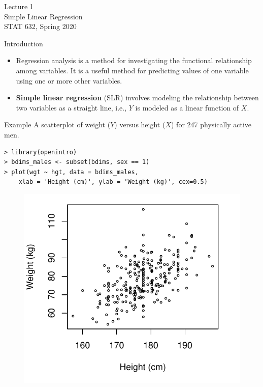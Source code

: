\documentclass[10pt]{beamer}
\begin{document}
\begin{frame}
\large
Lecture 1\\
Simple Linear Regression\\
STAT 632, Spring 2020
\end{frame}

\begin{frame}{Introduction}
\begin{itemize}
\item Regression analysis is a method for investigating the functional relationship among variables.  It is a useful method for predicting values of one variable using one or more other variables. 
\vspace{10pt}
\item \textbf{Simple linear regression} (SLR) involves modeling the relationship between two variables as a straight line, i.e., $Y$ is modeled as a linear function of $X$.
\end{itemize}
\end{frame}

\begin{frame}[fragile]{Example}
A scatterplot of weight ($Y$) versus height ($X$) for 247 physically active men.
\small
\begin{verbatim}
> library(openintro)
> bdims_males <- subset(bdims, sex == 1) 
> plot(wgt ~ hgt, data = bdims_males, 
    xlab = 'Height (cm)', ylab = 'Weight (kg)', cex=0.5)
\end{verbatim}
\begin{figure}[htbp]
\centering
\includegraphics[scale=0.5]{figure/wgt_hgt_plot.pdf}
\end{figure}
\end{frame}
\end{document}
